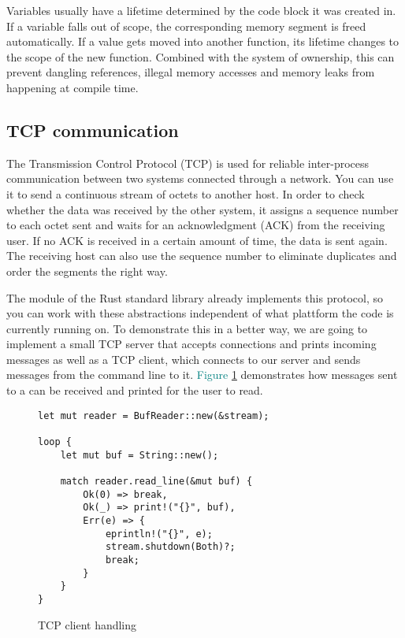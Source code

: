 Variables usually have a lifetime determined by the code block it was created in. If a variable falls out of scope, the
corresponding memory segment is freed automatically. If a value gets moved into another function, its lifetime changes
to the scope of the new function. Combined with the system of ownership, this can prevent dangling references, illegal
memory accesses and memory leaks from happening at compile time. \cite{c15safe}

\subsection{TCP communication}
The Transmission Control Protocol (TCP) is used for reliable inter-process communication between two systems connected
through a network. You can use it to send a continuous stream of octets to another host. In order to check whether the
data was received by the other system, it assigns a sequence number to each octet sent and waits for an acknowledgment
(ACK) from the receiving user. If no ACK is received in a certain amount of time, the data is sent again. The receiving
host can also use the sequence number to eliminate duplicates and order the segments the right way. \cite{RFC0793}

The module  of the Rust standard library already implements this protocol, so you can work with these
abstractions independent of what plattform the code is currently running on. To demonstrate this in a better way, we
are going to implement a small TCP server that accepts connections and prints incoming messages as well as a TCP
client, which connects to our server and sends messages from the command line to it.
\textcolor{teal}{Figure \ref{tcp-client-handeling}} demonstrates how messages sent to a  can
be received and printed for the user to read.

\begin{figure}[ht]
    \begin{verbatim}
let mut reader = BufReader::new(&stream);

loop {
    let mut buf = String::new();

    match reader.read_line(&mut buf) {
        Ok(0) => break,
        Ok(_) => print!("{}", buf),
        Err(e) => {
            eprintln!("{}", e);
            stream.shutdown(Both)?;
            break;
        }
    }
}
    \end{verbatim}
    \caption{TCP client handling}
    \label{tcp-client-handeling}
\end{figure}

